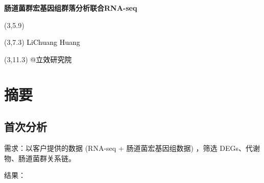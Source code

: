 \documentclass[
]{article}
\author{}
\date{\vspace{-2.5em}}
\begin{document}
\begin{titlepage} 
\begin{center} \textbf{\Huge
肠道菌群宏基因组群落分析联合RNA-seq} \vspace{4em}
\begin{textblock}{10}(3,5.9) \huge
\textbf{\textcolor{white}{2024-05-20}}
\end{textblock} \begin{textblock}{10}(3,7.3)
\Large \textcolor{black}{LiChuang Huang}
\end{textblock} \begin{textblock}{10}(3,11.3)
\Large \textcolor{black}{@立效研究院}
\end{textblock} \end{center} \end{titlepage}
\restoregeometry


\tableofcontents

\listoffigures

\listoftables

\newpage


\hypertarget{abstract}{%
\section{摘要}\label{abstract}}

\hypertarget{ux9996ux6b21ux5206ux6790}{%
\subsection{首次分析}\label{ux9996ux6b21ux5206ux6790}}

需求：以客户提供的数据 (RNA-seq + 肠道菌宏基因组数据) ，筛选 DEGs、代谢物、肠道菌群关系链。

结果：
\end{document}
